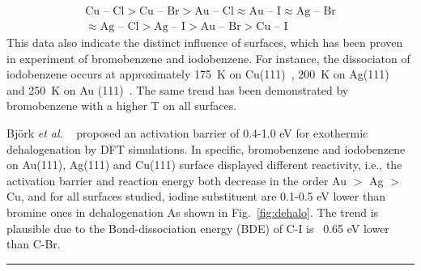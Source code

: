 \documentclass[%
 reprint,
 amsmath,amssymb,
 aps,
prb,
]{revtex4-2}
\begin{document}
\begin{gather*}
\text{Cu -- Cl} > \text{Cu -- Br} > \text{Au -- Cl} \approx \text{Au -- I} \approx \text{Ag -- Br}\\
 \approx \text{Ag -- Cl} > \text{Ag -- I} > \text{Au -- Br} > \text{Cu -- I}
\end{gather*}
%
This data also indicate the distinct influence of surfaces, which has been proven in experiment of bromobenzene and iodobenzene. For instance, the dissociaton of iodobenzene occurs at approximately 175~K on Cu(111)~\cite{sur_sci01}, 200~K on Ag(111)~\cite{sur_sci02} and 250~K on Au (111)~\cite{sur_sci03}. The same trend has been demonstrated by bromobenzene with a higher T on all surfaces.

Björk \textit{et al.} ~\cite{jacs2013} proposed an activation barrier of 0.4-1.0 eV for exothermic dehalogenation by DFT simulations. In specific, bromobenzene and iodobenzene on Au(111), Ag(111) and Cu(111) surface displayed different reactivity, i.e., the activation barrier and reaction energy both decrease in the order Au $>$ Ag $>$ Cu, and for all surfaces studied, iodine substituent are 0.1-0.5 eV lower than bromine ones in dehalogenation As shown in Fig.~\ref{fig:dehalo}. The trend is plausible due to the Bond-dissociation energy (BDE) of C-I is ~0.65 eV lower than C-Br\cite{Arpc1982}.

\rule{\columnwidth}{0.4pt}
\end{document}

